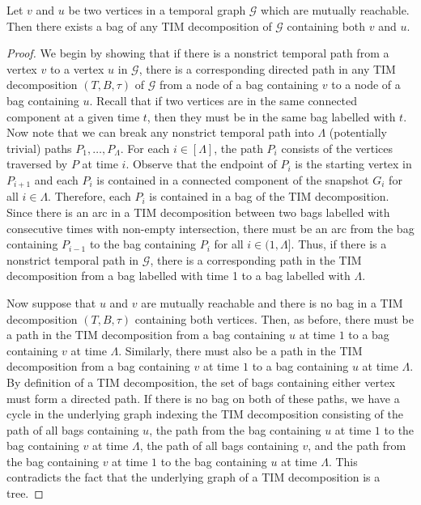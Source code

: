 \documentclass[a4paper,UKenglish,cleveref, autoref, thm-restate]{lipics-v2021} %
\begin{document}
\begin{toappendix}
\begin{lemmarep}\label{lem:EP-same-bag}
    Let $v$ and $u$ be two vertices in a temporal graph $\mathcal{G}$ which are mutually reachable. Then there exists a bag of any TIM decomposition of $\mathcal{G}$ containing both $v$ and $u$.
\end{lemmarep}
\begin{proof}
    We begin by showing that if there is a nonstrict temporal path from a vertex $v$ to a vertex $u$ in $\mathcal{G}$, there is a corresponding directed path in any TIM decomposition $(T,B,\tau)$ of $\mathcal{G}$ from a node of a bag containing $v$ to a node of a bag containing $u$. Recall that if two vertices are in the same connected component at a given time $t$, then they must be in the same bag labelled with $t$. Now note that we can break any nonstrict temporal path into $\Lambda$ (potentially trivial) paths $P_1,\ldots,P_{\Lambda}$. For each $i\in[\Lambda]$, the path $P_i$ consists of the vertices traversed by $P$ at time $i$. Observe that the endpoint of $P_i$ is the starting vertex in $P_{i+1}$ and each $P_i$ is contained in a connected component of the snapshot $G_i$ for all $i\in \Lambda$. Therefore, each $P_i$ is contained in a bag of the TIM decomposition. Since there is an arc in a TIM decomposition between two bags labelled with consecutive times with non-empty intersection, there must be an arc from the bag containing $P_{i-1}$ to the bag containing $P_i$ for all $i\in(1,\Lambda]$. Thus, if there is a nonstrict temporal path in $\mathcal{G}$, there is a corresponding path in the TIM decomposition from a bag labelled with time 1 to a bag labelled with $\Lambda$.

    Now suppose that $u$ and $v$ are mutually reachable and there is no bag in a TIM decomposition $(T,B,\tau)$ containing both vertices. Then, as before, there must be a path in the TIM decomposition from a bag containing $u$ at time $1$ to a bag containing $v$ at time $\Lambda$. Similarly, there must also be a path in the TIM decomposition from a bag containing $v$ at time $1$ to a bag containing $u$ at time $\Lambda$. By definition of a TIM decomposition, the set of bags containing either vertex must form a directed path. If there is no bag on both of 
    these paths, we have a cycle in the underlying graph indexing the TIM 
    decomposition consisting of the path of all bags containing $u$, the path from the bag containing $u$ at time $1$ to the bag containing $v$ at time $\Lambda$, the path of all bags containing $v$, and the path from the bag containing $v$ at time $1$ to the bag containing $u$ at time $\Lambda$. This contradicts the fact that the underlying graph of a TIM decomposition is a tree.
\end{proof}


\end{toappendix}
\end{document}
